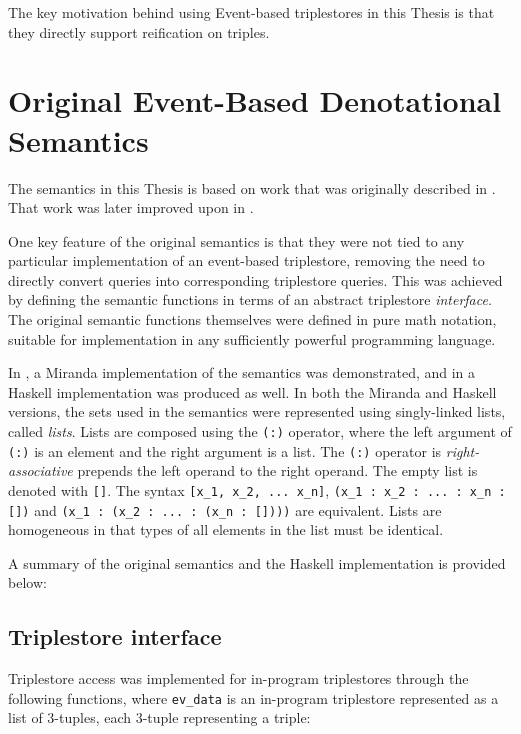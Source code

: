 \documentclass[../main.tex]{subfiles}
\begin{document}
The key motivation behind using Event-based triplestores in this Thesis is that they directly support reification on triples\cite{frostagboola2014}.

\section{Original Event-Based Denotational Semantics}

The semantics in this Thesis is based on work that was originally described in \cite{frost2013event}.  That work was later improved upon in \cite{frostagboola2014}.

One key feature of the original semantics is that they were not tied to any particular implementation of an event-based triplestore,
removing the need to directly convert queries into corresponding triplestore queries.
This was achieved by defining the semantic functions in terms of an abstract triplestore {\em interface}.
The original semantic functions themselves were defined in pure math notation, suitable for implementation in any sufficiently powerful programming language.

In \cite{frostagboola2014}, a Miranda implementation of the semantics was demonstrated, and in \cite{frost2014denotational} a Haskell
implementation was produced as well.  In both the Miranda and Haskell versions, the sets used in the semantics were represented using
singly-linked lists, called {\em lists}.  Lists are composed using the \texttt{(:)} operator, where the left argument of \texttt{(:)} is an element
and the right argument is a list.  The \texttt{(:)} operator is {\em right-associative} prepends the left operand to the right operand.  The empty list is denoted with
\texttt{[]}.  The syntax \texttt{[x\_1, x\_2, ... x\_n]}, \texttt{(x\_1 : x\_2 : ... : x\_n : [])} and \texttt{(x\_1 : (x\_2 : ... : (x\_n : [])))} are equivalent.
Lists are homogeneous in that types of all elements in the list must be identical.

A summary of the original semantics and the Haskell implementation is provided below:

\subsection{Triplestore interface}

Triplestore access was implemented for in-program triplestores through the following functions, where
\texttt{ev\_data} is an in-program triplestore represented as a list of 3-tuples, each 3-tuple representing a triple:
\end{document}
